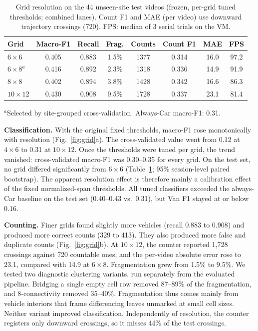 \documentclass[conference]{IEEEtran}
\begin{document}
\begin{table}[t]
\centering
\caption{Grid resolution on the 44 unseen-site test videos (frozen,
per-grid tuned thresholds; combined lanes). Count F1 and MAE (per video)
use downward trajectory crossings (720). FPS: median of 3 serial trials
on the VM.}
\label{tab:grid}
\scriptsize
\setlength{\tabcolsep}{3pt}
\begin{tabular}{lccccccc}
\toprule
\textbf{Grid} & \textbf{Macro-F1} & \textbf{Recall} & \textbf{Frag.} & \textbf{Counts} & \textbf{Count F1} & \textbf{MAE} & \textbf{FPS}\\
\midrule
$6{\times}6$   & 0.405 & 0.883 & 1.5\% & 1377 & 0.314 & 16.0 & 97.2\\
$6{\times}8^{a}$ & 0.416 & 0.892 & 2.3\% & 1318 & 0.336 & 14.9 & 91.9\\
$8{\times}8$   & 0.402 & 0.894 & 3.8\% & 1428 & 0.342 & 16.6 & 86.3\\
$10{\times}12$ & 0.430 & 0.908 & 9.5\% & 1728 & 0.337 & 23.1 & 81.4\\
\bottomrule
\end{tabular}

\smallskip
\parbox{\columnwidth}{\scriptsize $^{a}$Selected by site-grouped
cross-validation. Always-Car macro-F1: 0.31.}
\end{table}

\textbf{Classification.} With the original fixed thresholds, macro-F1
rose monotonically with resolution (Fig.~\ref{fig:grid}a). The
cross-validated value went from 0.12 at $4{\times}6$ to 0.31 at
$10{\times}12$. Once the thresholds were tuned per grid, the trend
vanished: cross-validated macro-F1 was 0.30--0.35 for every grid. On the
test set, no grid differed significantly from $6{\times}6$
(Table~\ref{tab:grid}; 95\% session-level paired bootstrap). The apparent
resolution effect is therefore mainly a calibration effect of the fixed
normalized-span thresholds. All tuned classifiers exceeded the always-Car
baseline on the test set (0.40--0.43 vs.\ 0.31), but Van F1 stayed at or
below 0.16.

\textbf{Counting.} Finer grids found slightly more vehicles (recall
0.883 to 0.908) and produced more correct counts (329 to 413). They also
produced more false and duplicate counts (Fig.~\ref{fig:grid}b). At
$10{\times}12$, the counter reported 1{,}728 crossings against 720
countable ones, and the per-video absolute error rose to 23.1, compared
with 14.9 at $6{\times}8$. Fragmentation grew from 1.5\% to 9.5\%. We
tested two diagnostic clustering variants, run separately from the
evaluated pipeline. Bridging a single empty cell row removed 87--89\% of
the fragmentation, and 8-connectivity removed 35--40\%. Fragmentation
thus comes mainly from vehicle interiors that frame differencing leaves
unmarked at small cell sizes. Neither variant improved classification.
Independently of resolution, the counter registers only downward
crossings, so it misses 44\% of the test crossings.
\end{document}
